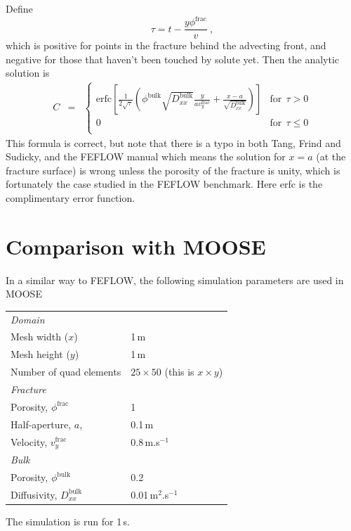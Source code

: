 \documentclass[]{scrreprt}
\begin{document}
Define
\begin{equation}
\tau = t - \frac{y\phi^{\mathrm{frac}}}{v}\ ,
\end{equation}
which is positive for points in the fracture behind the advecting
front, and negative for those that haven't been touched by solute
yet.  Then
the analytic solution is
\begin{eqnarray}
C & = & \left\{
\begin{array}{ll}
\mbox{erfc}\left[
\frac{1}{2\sqrt{\tau}}
\left( \phi^{\mathrm{bulk}}\sqrt{D_{xx}^{\mathrm{bulk}}}
\frac{y}{av_{y}^{\mathrm{frac}}}
+ \frac{x-a}{\sqrt{D_{xx}^{\mathrm{bulk}}}} \right) \right]
& \mbox{for}\ \ \tau > 0 \\
0 & \mbox{for}\ \ \tau \leq 0 \\
\end{array}
\right.
\end{eqnarray}
This formula is correct, but note that there is a typo in both Tang,
Frind and Sudicky, and the FEFLOW manual which means the solution for
$x=a$ (at the fracture surface) is wrong unless the porosity of the
fracture is unity, which is fortunately the case studied in the FEFLOW
benchmark.  Here erfc is the complimentary error function.


\section{Comparison with MOOSE}

In a similar way to FEFLOW, the following simulation parameters are
used in MOOSE \\
\begin{center}
\begin{tabular}{ll}
\hline
{\em Domain} \\
Mesh width ($x$) & 1\,m \\
Mesh height ($y$) & 1\,m \\
Number of quad elements & $25\times 50$ (this is $x\times y$) \\
\hline
{\em Fracture} \\
Porosity, $\phi^{\mathrm{frac}}$ & 1 \\
Half-aperture, $a$, & 0.1\,m \\
Velocity, $v_{y}^{\mathrm{frac}}$ & 0.8\,m.s$^{-1}$ \\
\hline
{\em Bulk} \\
Porosity, $\phi^{\mathrm{bulk}}$ & 0.2 \\
Diffusivity, $D_{xx}^{\mathrm{bulk}}$ & 0.01\,m$^{2}$.s$^{-1}$ \\
\hline
\end{tabular}
\end{center}
The simulation is run for 1\,s.
\end{document}
